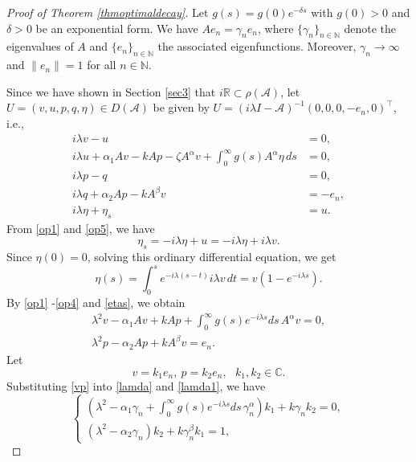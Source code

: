 \documentclass[12pt,reqno]{article}
\begin{document}
	\begin{proof}[Proof of Theorem \ref{thmoptimaldecay}]
		Let $g(s)=g(0)e^{-\delta s}$ with $g(0)>0$ and $\delta>0$ be an exponential form. We have $Ae_n = \gamma_n e_n$, where $\{\gamma_n\}_{n\in\mathbb{N}}$ denote the eigenvalues of $A$ and $\{e_n\}_{n\in\mathbb{N}}$ the associated eigenfunctions. Moreover, $\gamma_n\to\infty$ and $\|e_n\|=1$ for all $n\in\mathbb{N}$.

Since we have shown in Section \ref{sec3} that $i\mathbb{R}\subset\rho(\mathcal{A})$, let $ U=(v,u,p,q,\eta)\in D(\mathcal{A})$ be given by $U=(i\lambda I-\mathcal{A})^{-1}(0,0,0,-e_n,0)^\top$, i.e.,
		\begin{align}
			i\lambda v - u &= 0,\label{op1} \\
			i\lambda u + \alpha_1 A v - k A p - \zeta A^\alpha v + \int_0^\infty g(s)A^\alpha \eta\,ds &= 0 \label{op2},\\
			i\lambda p - q &= 0 \label{op3},\\
			i\lambda q + \alpha_2 A p - k A^\beta v &= -e_n,\label{op4} \\
			i\lambda \eta + \eta_s \label{op5}&= u.
		\end{align}
		From \eqref{op1} and \eqref{op5}, we have
		\[
		\eta_s = -i\lambda \eta + u = -i\lambda \eta + i\lambda v.
		\]
		Since $\eta(0)=0$, solving this ordinary differential equation, we get
		\begin{equation}\label{etas}
			\eta(s)=\int_0^s e^{-i\lambda(s-t)}i\lambda v\,dt = v(1-e^{-i\lambda s}).
		\end{equation}
		By \eqref{op1} -\eqref{op4} and \eqref{etas}, we obtain
		\begin{align}
			\lambda^2 v - \alpha_1 A v + k A p + \int_0^\infty g(s)e^{-i\lambda s}ds\,A^\alpha v = 0,\label{lamda} \\
			\lambda^2 p - \alpha_2 A p + k A^\beta v = e_n.\label{lamda1}
		\end{align}
		Let
\begin{equation}\label{vp}
  v=k_1 e_n,~p=k_2 e_n,~~~ k_1,k_2\in\mathbb{C}.
\end{equation}
		Substituting \eqref{vp} into \eqref{lamda} and \eqref{lamda1}, we have
		\[
		\begin{cases}
			\left(\lambda^2-\alpha_1\gamma_n+\displaystyle\int_0^\infty g(s)e^{-i\lambda s}ds\,\gamma_n^\alpha\right)k_1 + k\gamma_n k_2 = 0,\\
			\left(\lambda^2-\alpha_2\gamma_n\right)k_2 + k\gamma_n^\beta k_1 = 1,
		\end{cases}
\]
\end{proof}
\end{document}
